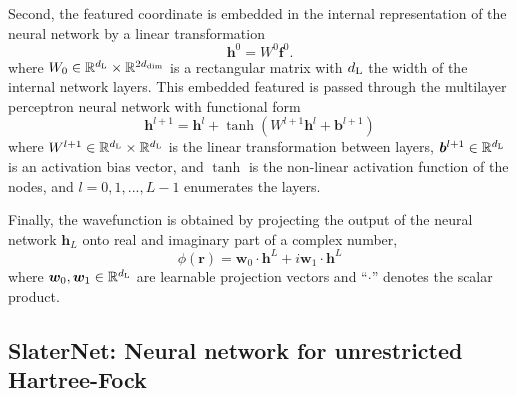 \documentclass[
 reprint,
 amsmath,amssymb,
 aps, prx,
floatfix,longbibliography,
]{revtex4-2}
\begin{document}
Second, the featured coordinate is embedded in the internal representation of the neural network by a linear transformation
\begin{equation}
    \bm h^0 = W^0 \bm f^0.
\end{equation} 
where $W_0 \in \mathbb{R}^{d_{\rm L}} \times \mathbb{R}^{2 d_{\rm dim}}$ is a rectangular matrix with $d_{\rm L}$ the width of the internal network layers. 
This embedded featured is passed through the 
multilayer perceptron neural network with functional form
\begin{equation} 
\bm h^{l + 1} = \bm h^l +  \tanh (W^{l+1} \bm h^l + \bm b^{l+1}) 
\label{eq:NN-orbital-MLP}
\end{equation}
where $W^{l+1} \in \mathbb{R}^{d_{\rm L}} \times \mathbb{R}^{d_{\rm L}}$ is the linear transformation between layers, $\bm b^{l+1} \in \mathbb{R}^{d_{\rm L}}$ is an activation bias vector, and $\tanh$ is the non-linear activation function of the nodes, and $l = 0, 1, ..., L - 1$ enumerates the layers. 

Finally, the wavefunction is obtained by projecting the output of the neural network $\bm h_{L}$ onto real and imaginary part of a complex number,
\begin{equation}
    \phi(\bm r) = \bm w_0 \cdot \bm h^{L} + i \bm w_1 \cdot \bm h^{L}
    \label{eq:NN-orbital-phi}
\end{equation} 
where $\bm w_0, \bm w_1 \in \mathbb{R}^{d_{\rm L}}$ are learnable projection vectors and ``$\cdot$'' denotes the scalar product. 


\subsection{SlaterNet: Neural network for unrestricted Hartree-Fock}
\label{sec:NN-SlaterNet}
\end{document}
